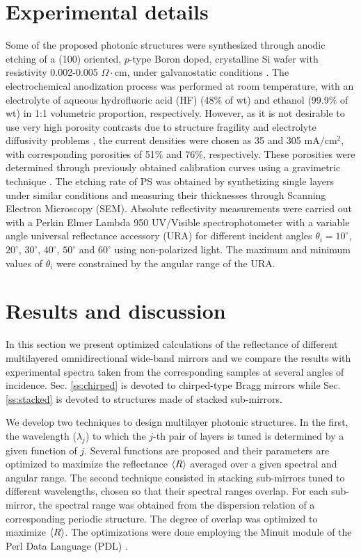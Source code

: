 \documentclass[a4paper,fleqn]{cas-sc}
\begin{document}
	\section{Experimental details}\label{s:exp}
	
	
	Some of the proposed photonic structures were synthesized through anodic
	etching of a (100) oriented, $p$-type Boron doped, crystalline Si wafer with
	resistivity 0.002-0.005 $\Omega \cdot $cm, under galvanostatic conditions
	\cite{Canham1990,Escorcia2007}. The electrochemical anodization process was
	performed at room temperature, with an electrolyte of aqueous
	hydrofluoric acid (HF) (48$\%$ of
	wt) and ethanol (99.9$\%$ of wt) in 1:1 volumetric proportion, respectively.
	However, as it is not desirable to use very high
	porosity contrasts due to structure fragility and electrolyte
	diffusivity problems \cite{Ariza2011}, the current
	densities were chosen as 35 and 305 $\text{mA}/\text{cm}^{2}$,
	with corresponding porosities of 51\% and 76\%, respectively.
	These porosities were determined through previously obtained calibration
	curves using a gravimetric technique \cite{Pap2006}. The
	etching rate of PS was obtained by synthetizing single layers under
	similar conditions and measuring their thicknesses through Scanning
	Electron Microscopy (SEM). Absolute reflectivity measurements were
	carried out with a Perkin Elmer Lambda 950 UV/Visible
	spectrophotometer with a variable angle universal reflectance
	accessory (URA) for different incident angles $\theta _{i}=10^{\circ
	}$, $20^{\circ }$, $30^{\circ }$, $40^{\circ }$, $50^{\circ }$ and
	$60^{\circ }$ using non-polarized light. The maximum and minimum
	values of $\theta _{i}$ were constrained by the angular range of the
	URA.
	
	
	\section{Results and discussion}\label{s:res}
	
	
	In this section we present optimized calculations of the reflectance
	of different multilayered omnidirectional wide-band mirrors and we
	compare the results with experimental spectra taken from
	the corresponding samples at several angles of
	incidence. Sec. \ref{ss:chirped} is devoted to chirped-type Bragg
	mirrors while Sec. \ref{ss:stacked} is devoted to structures made of
	stacked sub-mirrors.
	
	We develop two techniques to design
	multilayer photonic structures. In the first, the wavelength
	($\lambda _{j}$) to which the $j$-th pair of layers is tuned is determined by
	a given function of $j$. Several functions are proposed and their
	parameters are optimized to maximize the reflectance $\braket{R}$ averaged over
	a given spectral and angular range.
	The second technique consisted in stacking
	sub-mirrors tuned to different wavelengths, chosen so that their
	spectral ranges overlap. For each sub-mirror, the spectral range was
	obtained from the dispersion relation of a corresponding periodic
	structure. The degree of overlap was optimized to maximize $\braket{R}$.
	The optimizations were done employing the Minuit module  \cite{minuit}
	of the Perl Data Language (PDL) \cite{PDL1997}.
	
\end{document}
